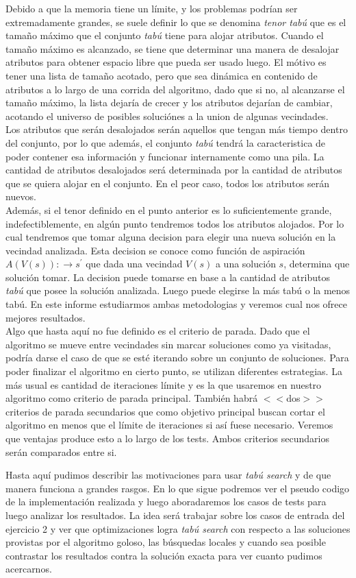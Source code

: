 Debido a que la memoria tiene un límite, y los problemas podrían ser extremadamente grandes, se suele definir lo que se denomina \textit{tenor tabú} que es el tamaño máximo que el conjunto \textit{tabú} tiene para alojar atributos. Cuando el tamaño máximo es alcanzado, se tiene que determinar una manera de desalojar atributos para obtener espacio libre que pueda ser usado luego. El mótivo es tener una lista de tamaño acotado, pero que sea dinámica en contenido de atributos a lo largo de una corrida del algoritmo, dado que si no, al alcanzarse el tamaño máximo, la lista dejaría de crecer y los atributos dejarían de cambiar, acotando el universo de posibles soluciónes a la union de algunas vecindades.\\
Los atributos que serán desalojados serán aquellos que tengan más tiempo dentro del conjunto, por lo que además, el conjunto \textit{tabú} tendrá la caracteristica de poder contener esa información y funcionar internamente como una pila. 
La cantidad de atributos desalojados será determinada por la cantidad de atributos que se quiera alojar en el conjunto. En el peor caso, todos los atributos serán nuevos.\\

Además, si el tenor definido en el punto anterior es lo suficientemente grande, indefectiblemente, en algún punto tendremos todos los atributos alojados. Por lo cual tendremos que tomar alguna decision para elegir una nueva solución en la vecindad analizada. Esta decision se conoce como función de aspiración $A(V(s)): \rightarrow s^{'}$ que dada una vecindad $V(s)$ a una solución $s$, determina que solución tomar.
La decision puede tomarse en base a la cantidad de atributos \textit{tabú} que posee la solución analizada. Luego puede elegirse la más tabú o la menos tabú.
En este informe estudiarmos ambas metodologias y veremos cual nos ofrece mejores resultados.\\

Algo que hasta aquí no fue definido es el criterio de parada. Dado que el algoritmo se mueve entre vecindades sin marcar soluciones como ya visitadas, podría darse el caso de que se esté iterando sobre un conjunto de soluciones. Para poder finalizar el algoritmo en cierto punto, se utilizan diferentes estrategias. La más usual es cantidad de iteraciones límite y es la que usaremos en nuestro algoritmo como criterio de parada principal. También habrá $<<$dos$>>$ criterios de parada secundarios que como objetivo principal buscan cortar el algoritmo en menos que el límite de iteraciones si así fuese necesario. Veremos que ventajas produce esto a lo largo de los tests. Ambos criterios secundarios serán comparados entre si.

Hasta aquí pudimos describir las motivaciones para usar \textit{tabú search} y de que manera funciona a grandes rasgos. En lo que sigue podremos ver el pseudo codigo de la implementación realizada y luego aboradaremos los casos de tests para luego analizar los resultados.  La idea será trabajar sobre los casos de entrada del ejercicio 2 y ver que optimizaciones logra \textit{tabú search} con respecto a las soluciones provistas por el algoritmo goloso, las búsquedas locales y cuando sea posible contrastar los resultados contra la solución exacta para ver cuanto pudimos acercarnos.
